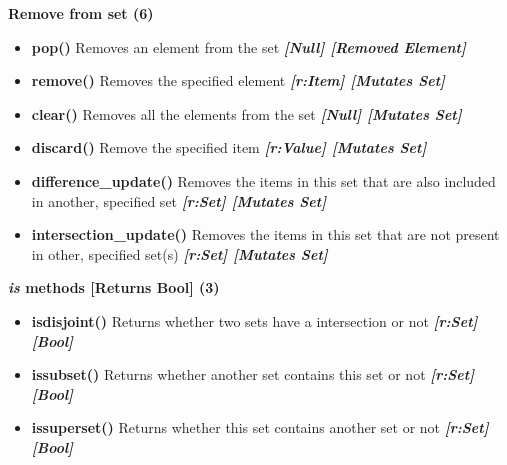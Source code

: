 \documentclass{report}
\begin{document}
    \bigbreak \noindent 
    
        \begin{center}
            \textbf{Remove from set (6)}
        \end{center}
        \begin{itemize}
            \item[\ding{43}] \textbf{pop()}	Removes an element from the set
                \smallbreak \noindent
                \textbf{\textit{[Null] [Removed Element]}}
                \smallbreak \noindent
            \item[\ding{43}] \textbf{remove()}	Removes the specified element
                \smallbreak \noindent
                \textbf{\textit{[r:Item] [Mutates Set]}}
                \smallbreak \noindent
            \item[\ding{43}] \textbf{clear()}	Removes all the elements from the set
                \smallbreak \noindent
                \textbf{\textit{[Null] [Mutates Set]}}
                \smallbreak \noindent
            \item[\ding{43}] \textbf{discard()}	Remove the specified item
                \smallbreak \noindent
                \textbf{\textit{[r:Value] [Mutates Set]}}
                \smallbreak \noindent
            \item[\ding{43}] \textbf{difference\_update()}	Removes the items in this set that are also included in another, specified set
                \smallbreak \noindent
                \textbf{\textit{[r:Set] [Mutates Set]}}
                \smallbreak \noindent
              \item[\ding{43}] \textbf{intersection\_update()}	Removes the items in this set that are not present in other, specified set(s)
                \smallbreak \noindent
                \textbf{\textit{[r:Set] [Mutates Set]}}
        \end{itemize}
        \bigbreak \noindent 
    

    \pagebreak \bigbreak \noindent
    
      \begin{center}
        \textbf{\textit{is} methods [Returns Bool] (3)}
      \end{center}
      \begin{itemize}
        \item[\ding{43}] \textbf{isdisjoint()}	Returns whether two sets have a intersection or not
          \smallbreak \noindent
          \textbf{\textit{[r:Set] [Bool]}}
          \smallbreak \noindent
        \item[\ding{43}] \textbf{issubset()}	Returns whether another set contains this set or not
          \smallbreak \noindent
          \textbf{\textit{[r:Set] [Bool]}}
          \smallbreak \noindent
        \item[\ding{43}] \textbf{issuperset()}	Returns whether this set contains another set or not
          \smallbreak \noindent
          \textbf{\textit{[r:Set] [Bool]}}
      \end{itemize}
    
\end{document}
